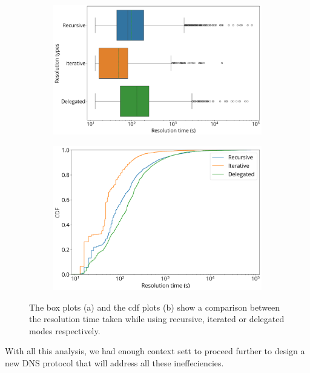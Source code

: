 \documentclass[conference]{IEEEtran}
\begin{document}
\begin{figure}[htbp]
    \centering
    \begin{subfigure}[b]{0.9\linewidth}
        \centering
        \includegraphics[width=\linewidth]{images/delegation-box.png}
        \caption{}
    \end{subfigure}
    \begin{subfigure}[b]{0.9\linewidth}
        \centering
        \includegraphics[width=\linewidth]{images/delegation-cdf.png}
        \caption{}
    \end{subfigure}
    \caption{The box plots (a) and the cdf plots (b) show a comparison between the resolution time taken while using recursive, iterated or delegated modes respectively.}
    \label{fig:delegation}
\end{figure}

With all this analysis, we had enough context sett to proceed further to design a new DNS protocol that will address all these ineffeciencies.
\end{document}
